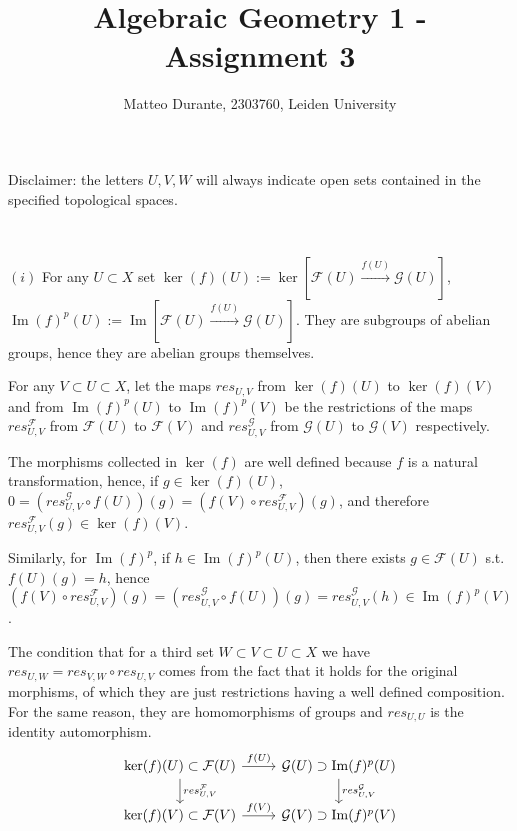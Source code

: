 \documentclass{article}
\newcommand{\exercise}[1]{\noindent {\bf Exercise #1}}
\DeclareMathOperator{\Ima}{Im}
\begin{document}
\title{Algebraic Geometry 1 - Assignment 3}

\author{Matteo Durante, 2303760, Leiden University}

\maketitle

Disclaimer: the letters $U,V,W$ will always indicate open sets contained in the specified topological spaces.


~\\
\exercise{4.6.25}

$(i)$ For any $U\subset X$ set $\ker(f)(U):=\ker[\mathcal{F}(U)\xrightarrow{f(U)}\mathcal{G}(U)]$, $\Ima(f)^p(U):=\Ima[\mathcal{F}(U)\xrightarrow{f(U)}\mathcal{G}(U)]$. They are subgroups of abelian groups, hence they are abelian groups themselves.

For any $V\subset U\subset X$, let the maps $res_{U,V}$ from $\ker(f)(U)$ to $\ker(f)(V)$ and from $\Ima(f)^p(U)$ to $\Ima(f)^p(V)$ be the restrictions of the maps $res^{\mathcal{F}}_{U,V}$ from $\mathcal{F}(U)$ to $\mathcal{F}(V)$ and $res^{\mathcal{G}}_{U,V}$ from $\mathcal{G}(U)$ to $\mathcal{G}(V)$ respectively.

The morphisms collected in $\ker(f)$ are well defined because $f$ is a natural transformation, hence, if $g\in\ker(f)(U)$, $0=(res^{\mathcal{G}}_{U,V}\circ f(U))(g)=(f(V)\circ res^{\mathcal{F}}_{U,V})(g)$, and therefore $res^{\mathcal{F}}_{U,V}(g)\in\ker(f)(V)$.

Similarly, for $\Ima(f)^p$, if $h\in\Ima(f)^p(U)$, then there exists $g\in\mathcal{F}(U)$ s.t. $f(U)(g)=h$, hence $(f(V)\circ res^{\mathcal{F}}_{U,V})(g)=(res^{\mathcal{G}}_{U,V}\circ f(U))(g)=res^{\mathcal{G}}_{U,V}(h)\in\Ima(f)^p(V)$.

The condition that for a third set $W\subset V\subset U\subset X$ we have $res_{U,W}=res_{V,W}\circ res_{U,V}$ comes from the fact that it holds for the original morphisms, of which they are just restrictions having a well defined composition. For the same reason, they are homomorphisms of groups and $res_{U,U}$ is the identity automorphism.
\[
\begin{tikzcd}
		\ker(f)(U)\subset\mathcal{F}(U)\arrow{r}{f(U)}
		\arrow{d}{res^{\mathcal{F}}_{U,V}}
		&\mathcal{G}(U)\arrow{d}{res^{\mathcal{G}}_{U,V}}\supset\Ima(f)^p(U) \\
		\ker(f)(V)\subset\mathcal{F}(V)\arrow{r}{f(V)}
		&\mathcal{G}(V)\supset\Ima(f)^p(V)
\end{tikzcd}
\]
\end{document}
